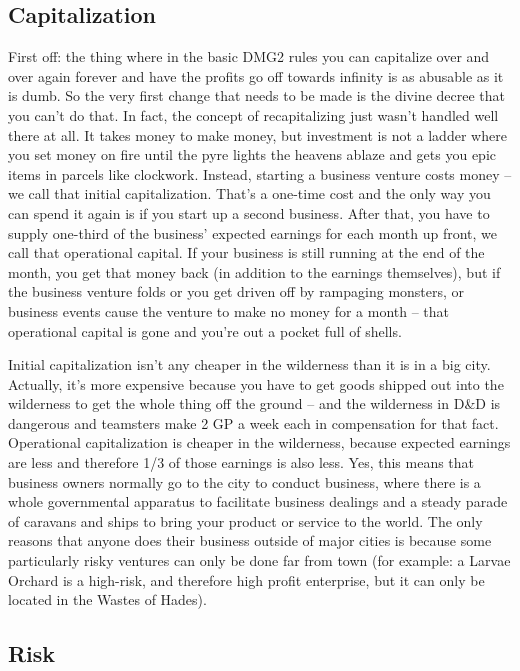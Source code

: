 \subsection{Capitalization}

First off: the thing where in the basic DMG2 rules you can capitalize over and over again forever and have the profits go off towards infinity is as abusable as it is dumb. So the very first change that needs to be made is the divine decree that you can't do that. In fact, the concept of recapitalizing just wasn't handled well there at all. It takes money to make money, but investment is not a ladder where you set money on fire until the pyre lights the heavens ablaze and gets you epic items in parcels like clockwork. Instead, starting a business venture costs money -- we call that initial capitalization. That's a one-time cost and the only way you can spend it again is if you start up a second business. After that, you have to supply one-third of the business' expected earnings for each month up front, we call that operational capital. If your business is still running at the end of the month, you get that money back (in addition to the earnings themselves), but if the business venture folds or you get driven off by rampaging monsters, or business events cause the venture to make no money for a month -- that operational capital is gone and you're out a pocket full of shells.

Initial capitalization isn't any cheaper in the wilderness than it is in a big city. Actually, it's more expensive because you have to get goods shipped out into the wilderness to get the whole thing off the ground -- and the wilderness in D\&D is dangerous and teamsters make 2 GP a week each in compensation for that fact. Operational capitalization is cheaper in the wilderness, because expected earnings are less and therefore 1/3 of those earnings is also less. Yes, this means that business owners normally go to the city to conduct business, where there is a whole governmental apparatus to facilitate business dealings and a steady parade of caravans and ships to bring your product or service to the world. The only reasons that anyone does their business outside of major cities is because some particularly risky ventures can only be done far from town (for example: a Larvae Orchard is a high-risk, and therefore high profit enterprise, but it can only be located in the Wastes of Hades).

\subsection{Risk}

